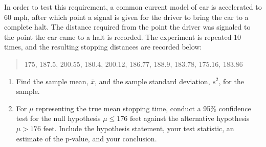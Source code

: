 \documentclass[11pt]{article}
\begin{document}
\begin{enumerate}
  In order to test this requirement, a common current model of car is
  accelerated to 60 mph, after which point a signal is given for the
  driver to bring the car to a complete halt. The distance required from
  the point the driver was signaled to the point the car came to a halt
  is recorded. The experiment is repeated 10 times, and the resulting
  stopping distances are recorded below:

  \begin{quote}
  175, 187.5, 200.55, 180.4, 200.12, 186.77, 188.9, 183.78, 175.16,
  183.86
  \end{quote}

  \begin{enumerate}
  \def\labelenumii{\alph{enumii}.}
  \item
    Find the sample mean, \(\bar{x}\), and the sample standard
    deviation, \(s^2\), for the sample.
  \item
    For \(\mu\) representing the true mean stopping time, conduct a 95\%
    confidence test for the null hypothesis \(\mu \le 176 \text{ feet}\)
    against the alternative hypothesis \(\mu > 176 \text{ feet}\).
    Include the hypothesis statement, your test statistic, an estimate
    of the p-value, and your conclusion.
  \end{enumerate}
\end{enumerate}

\newpage
\end{document}
